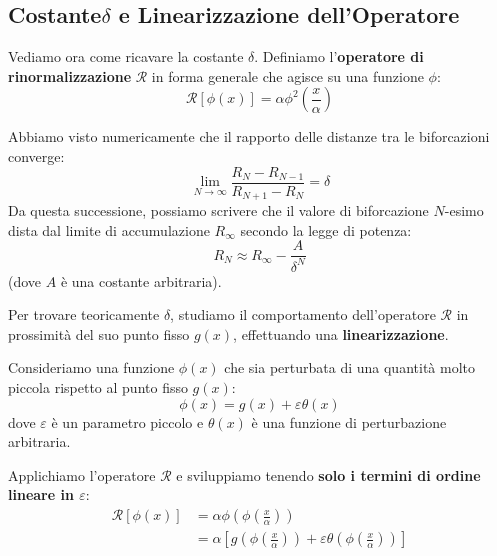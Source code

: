 \documentclass[openany]{book}
\theoremstyle{definition}
\theoremstyle{remark}
\begin{document}
\vspace{0.5em}
\noindent{}
\vspace{0.5em}

\subsection{Costante\texorpdfstring{$\delta$}{delta} e Linearizzazione dell'Operatore}

Vediamo ora come ricavare la costante $\delta$. Definiamo l'\textbf{operatore di rinormalizzazione} $\mathcal{R}$ in forma generale che agisce su una funzione $\phi$:
\begin{equation}
    \mathcal{R}[\phi(x)] = \alpha \phi^2\left(\frac{x}{\alpha}\right)
\end{equation}

Abbiamo visto numericamente che il rapporto delle distanze tra le biforcazioni converge:
\begin{equation*}
    \lim_{N \to \infty} \frac{R_N - R_{N-1}}{R_{N+1} - R_N} = \delta
\end{equation*}
Da questa successione, possiamo scrivere che il valore di biforcazione $N$-esimo dista dal limite di accumulazione $R_\infty$ secondo la legge di potenza:
\begin{equation}
    R_N \approx R_\infty - \frac{A}{\delta^N}
\end{equation}
(dove $A$ è una costante arbitraria).

Per trovare teoricamente $\delta$, studiamo il comportamento dell'operatore $\mathcal{R}$ in prossimità del suo punto fisso $g(x)$, effettuando una \textbf{linearizzazione}.

Consideriamo una funzione $\phi(x)$ che sia perturbata di una quantità molto piccola rispetto al punto fisso $g(x)$:
\begin{equation}
    \phi(x) = g(x) + \varepsilon \theta(x)
\end{equation}
dove $\varepsilon$ è un parametro piccolo e $\theta(x)$ è una funzione di perturbazione arbitraria.

Applichiamo l'operatore $\mathcal{R}$ e sviluppiamo tenendo \textbf{solo i termini di ordine lineare in $\varepsilon$}:
\begin{align*}
    \mathcal{R}[\phi(x)] &= \alpha \phi\left(\phi\left(\frac{x}{\alpha}\right)\right) \\
    &= \alpha \left[ g\left(\phi\left(\frac{x}{\alpha}\right)\right) + \varepsilon \theta\left(\phi\left(\frac{x}{\alpha}\right)\right) \right]
\end{align*}
\end{document}
